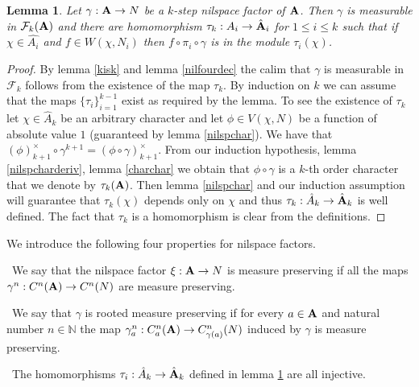 \documentclass [11pt] {article}
\newtheorem{lemma}{Lemma}[section]
\def\bA{{\bf A}}
\begin{document}
\begin{lemma}\label{homok} Let $\gamma:\bA\rightarrow N$ be a $k$-step nilspace factor of $\bA$. Then $\gamma$ is measurable in $\mathcal{F}_k(\bA)$ and there are homomorphism $\tau_k:A_i\rightarrow\hat{\bA}_i$ for $1\leq i\leq k$ such that if $\chi\in\hat{A_i}$ and $f\in W(\chi,N_i)$ then $f\circ\pi_i\circ\gamma$ is in the module $\tau_i(\chi)$. 
\end{lemma}

\begin{proof} By lemma \ref{kisk} and lemma \ref{nilfourdec} the calim that $\gamma$ is measurable in $\mathcal{F}_k$ follows from the existence of the map $\tau_k$. By induction on $k$ we can assume that the maps $\{\tau_i\}_{i=1}^{k-1}$ exist as required by the lemma. To see the existence of $\tau_k$ let $\chi\in\hat{A}_k$ be an arbitrary character and let $\phi\in V(\chi,N)$ be a function of absolute value $1$ (guaranteed by lemma \ref{nilspchar}). We have that $(\phi)_{k+1}^\times\circ\gamma^{k+1}=(\phi\circ\gamma)_{k+1}^\times$.
From our induction hypothesis, lemma \ref{nilspcharderiv}, lemma \ref{charchar} we obtain that $\phi\circ\gamma$ is a $k$-th order character that we denote by $\tau_k(\bA)$. Then lemma \ref{nilspchar} and our induction assumption will guarantee that $\tau_k(\chi)$ depends only on $\chi$ and thus $\tau_k:\hat{A}_k\rightarrow\hat{\bA}_k$ is well defined.
The fact that $\tau_k$ is a homomorphism is clear from the definitions.
\end{proof}

We introduce the following four properties for nilspace factors.

\medskip

~We say that the nilspace factor $\xi:\bA\rightarrow N$ is measure preserving if all the maps $\gamma^n:C^n(\bA)\rightarrow C^n(N)$ are measure preserving.

\medskip

~We say that $\gamma$ is rooted measure preserving if for every $a\in\bA$ and natural number $n\in\mathbb{N}$ the map $\gamma^n_a:C^n_a(\bA)\rightarrow C^n_{\gamma(a)}(N)$ induced by $\gamma$ is measure preserving.

\medskip

~The homomorphisms $\tau_i:\hat{A}_k\rightarrow\hat{\bA}_k$ defined in lemma \ref{homok} are all injective.

\medskip
\end{document}
